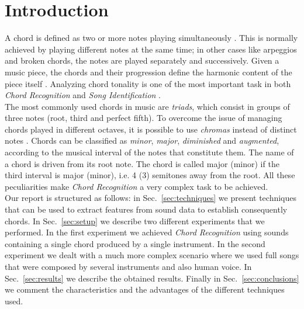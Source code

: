 \section{Introduction}
\label{sec:intro}

A chord is defined as two or more notes playing simultaneously \cite{benward2014music}. This is normally achieved by playing different notes at the same time; in other cases like arpeggios and broken chords, the notes are played separately and successively. Given a music piece, the chords and their progression define the harmonic content of the piece itself \cite{papadopoulos2007large}. Analyzing chord tonality is one of the most important task in both \textit{Chord Recognition} and \textit{Song Identification} \cite{lee2006identifying}.\\
%
The most commonly used chords in music are \textit{triads}, which consist in groups of three notes (root, third and perfect fifth). To overcome the issue of managing chords played in different octaves, it is possible to use \textit{chromas} instead of distinct notes \cite{bartsch2005audio}. Chords can be classified as \textit{minor}, \textit{major}, \textit{diminished} and \textit{augmented}, according to the musical interval of the notes that constitute them. The name of a chord is driven from its root note. The chord is called major (minor) if the third interval is major (minor), i.e. 4 (3) semitones away from the root. All these peculiarities make \textit{Chord Recognition} a very complex task to be achieved.\\
%
Our report is structured as follows: in Sec.~\ref{sec:techniques} we present techniques that can be used to extract features from sound data to establish consequently chords. In Sec.~\ref{sec:setup} we describe two different experiments that we performed. In the first experiment we achieved \textit{Chord Recognition} using sounds containing a single chord produced by a single instrument. In the second experiment we dealt with a much more complex scenario where we used full songs that were composed by several instruments and also human voice. In Sec.~\ref{sec:results} we describe the obtained results. Finally in Sec.~\ref{sec:conclusions} we comment the characteristics and the advantages of the different techniques used. 
